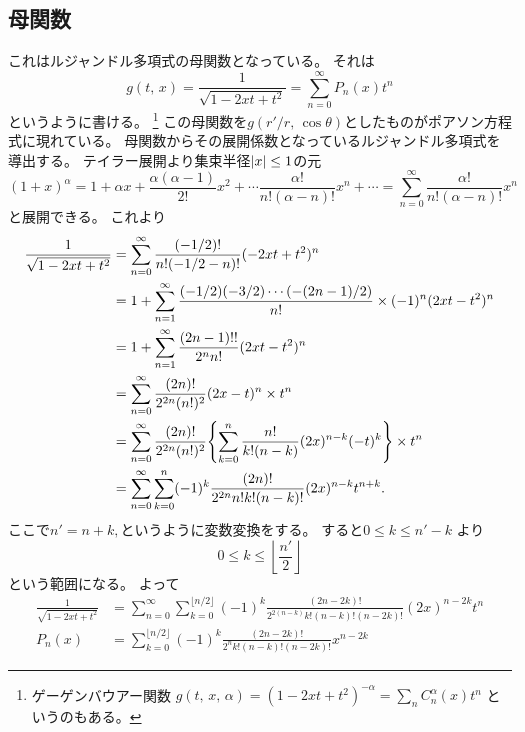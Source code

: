\documentclass[../../master.tex]{subfiles}
\begin{document}
\subsection{母関数}
これはルジャンドル多項式の母関数となっている。
それは
\begin{equation}
	g(t,\,x) = \frac{1}{\sqrt{1-2xt+t^2}} = \sum_{n=0}^{\infty}P_n(x)t^n
\end{equation}
というように書ける。
\footnote{
ゲーゲンバウアー関数
\(g(t,\,x,\,\alpha) = (1-2xt+t^2)^{-\alpha}=\sum_n C_n^{\alpha}(x)t^n\)
というのもある。
}
この母関数を\(g(r'/r,\,\cos\theta)\)としたものがポアソン方程式に現れている。
母関数からその展開係数となっているルジャンドル多項式を導出する。
テイラー展開より集束半径\(\abs{x}\leq1\)の元
\begin{equation}
	(1+x)^\alpha = 1 + \alpha x + \frac{\alpha(\alpha-1)}{2!}x^2+\cdots\frac{\alpha !}{n! (\alpha-n)!}x^n + \cdots
	= \sum_{n=0}^{\infty} \frac{\alpha !}{n! (\alpha-n)!}x^n
\end{equation}
と展開できる。
これより
\begin{align}
	\frac{1}{\sqrt{1-2xt+t^2}} & = \sum_{n=0}^{\infty} \frac{(-1/2)!}{n!(-1/2-n)!}(-2xt+t^2)^n                                                     \\
	                           & = 1+\sum_{n=1}^{\infty} \frac{(-1/2)(-3/2)\cdots(-(2n-1)/2)}{n!}\times(-1)^n(2xt-t^2)^n                           \\
	                           & = 1+\sum_{n=1}^{\infty} \frac{(2n-1)!!}{2^n n!}(2xt-t^2)^n                                                        \\
	                           & = \sum_{n=0}^{\infty} \frac{(2n)!}{2^{2n}(n!)^2}(2x-t)^n \times t^n                                               \\
	                           & = \sum_{n=0}^{\infty} \frac{(2n)!}{2^{2n}(n!)^2}\qty{\sum_{k=0}^{n}\frac{n!}{k!(n-k)}(2x)^{n-k}(-t)^k} \times t^n \\
	                           & = \sum_{n=0}^{\infty}\sum_{k=0}^{n}(-1)^k \frac{(2n)!}{2^{2n}n!k!(n-k)!}(2x)^{n-k}t^{n+k}.
\end{align}
ここで\(n' = n+k,\)というように変数変換をする。
すると\(0 \leq k \leq n' -k\) より
\begin{equation}
	0 \leq k \leq \left\lfloor \frac{n'}{2} \right\rfloor
\end{equation}
という範囲になる。
よって
\begin{align}
	\frac{1}{\sqrt{1-2xt+t^2}}
	       & = \sum_{n=0}^{\infty}\sum_{k=0}^{\lfloor n/2 \rfloor}(-1)^k \frac{(2n-2k)!}{2^{2(n-k)}k!(n-k)!(n-2k)!}(2x)^{n-2k}t^{n} \\
	P_n(x) & = \sum_{k=0}^{\lfloor n/2 \rfloor}(-1)^k \frac{(2n-2k)!}{2^n k!(n-k)!(n-2k)!}x^{n-2k}
\end{align}
\end{document}
